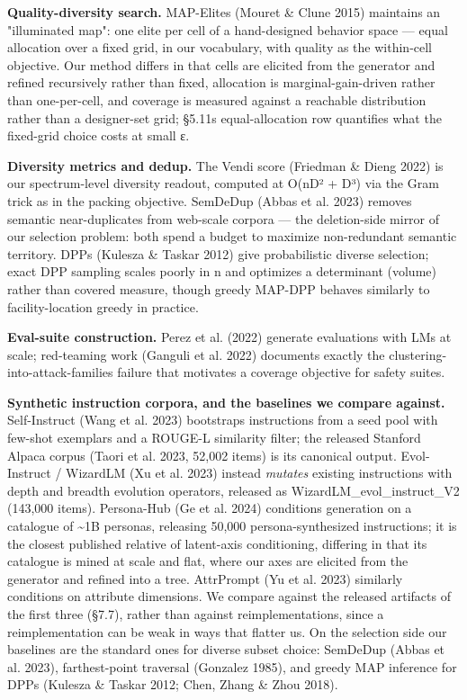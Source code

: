 \documentclass[
  10pt,
]{article}
\theoremstyle{plain}
\theoremstyle{definition}
\begin{document}
\textbf{Quality-diversity search.} MAP-Elites (Mouret \& Clune 2015)
maintains an "illuminated map": one elite per cell of a hand-designed
behavior space --- equal allocation over a fixed grid, in our
vocabulary, with quality as the within-cell objective. Our method
differs in that cells are elicited from the generator and refined
recursively rather than fixed, allocation is marginal-gain-driven rather
than one-per-cell, and coverage is measured against a reachable
distribution rather than a designer-set grid; §5.11\textquotesingle s
equal-allocation row quantifies what the fixed-grid choice costs at
small ε.

\textbf{Diversity metrics and dedup.} The Vendi score (Friedman \& Dieng
2022) is our spectrum-level diversity readout, computed at O(nD² + D³)
via the Gram trick as in the packing objective. SemDeDup (Abbas et al.
2023) removes semantic near-duplicates from web-scale corpora --- the
deletion-side mirror of our selection problem: both spend a budget to
maximize non-redundant semantic territory. DPPs (Kulesza \& Taskar 2012)
give probabilistic diverse selection; exact DPP sampling scales poorly
in n and optimizes a determinant (volume) rather than covered measure,
though greedy MAP-DPP behaves similarly to facility-location greedy in
practice.

\textbf{Eval-suite construction.} Perez et al. (2022) generate
evaluations with LMs at scale; red-teaming work (Ganguli et al. 2022)
documents exactly the clustering-into-attack-families failure that
motivates a coverage objective for safety suites.

\textbf{Synthetic instruction corpora, and the baselines we compare
against.} Self-Instruct (Wang et al. 2023) bootstraps instructions from
a seed pool with few-shot exemplars and a ROUGE-L similarity filter; the
released Stanford Alpaca corpus (Taori et al. 2023, 52,002 items) is its
canonical output. Evol-Instruct / WizardLM (Xu et al. 2023) instead
\emph{mutates} existing instructions with depth and breadth evolution
operators, released as WizardLM\_evol\_instruct\_V2 (143,000 items).
Persona-Hub (Ge et al. 2024) conditions generation on a catalogue of
\textasciitilde1B personas, releasing 50,000 persona-synthesized
instructions; it is the closest published relative of latent-axis
conditioning, differing in that its catalogue is mined at scale and
flat, where our axes are elicited from the generator and refined into a
tree. AttrPrompt (Yu et al. 2023) similarly conditions on attribute
dimensions. We compare against the released artifacts of the first three
(§7.7), rather than against reimplementations, since a reimplementation
can be weak in ways that flatter us. On the selection side our baselines
are the standard ones for diverse subset choice: SemDeDup (Abbas et al.
2023), farthest-point traversal (Gonzalez 1985), and greedy MAP
inference for DPPs (Kulesza \& Taskar 2012; Chen, Zhang \& Zhou 2018).
\end{document}
